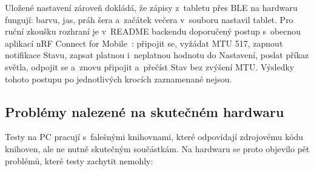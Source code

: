 Uložené nastavení zároveň dokládá, že zápisy z~tabletu přes BLE na hardwaru fungují: barvu,
jas, práh šera a~začátek večera v~souboru nastavil tablet. Pro ruční zkoušku rozhraní je
v~README backendu doporučený postup s~obecnou aplikací nRF Connect for
Mobile~\cite{nrfconnect}: připojit se, vyžádat MTU 517, zapnout notifikace Stavu, zapsat platnou
i~neplatnou hodnotu do Nastavení, poslat příkaz světla, odpojit se a~znovu připojit a~přečíst
Stav bez zvýšení MTU. Výsledky tohoto postupu po jednotlivých krocích zaznamenané nejsou.

\subsection{Problémy nalezené na skutečném hardwaru}
\label{sec:problemy-hw}

Testy na PC pracují s~falešnými knihovnami, které odpovídají zdrojovému kódu knihoven, ale ne
nutně skutečným součástkám. Na hardwaru se proto objevilo pět problémů, které testy zachytit
nemohly:
